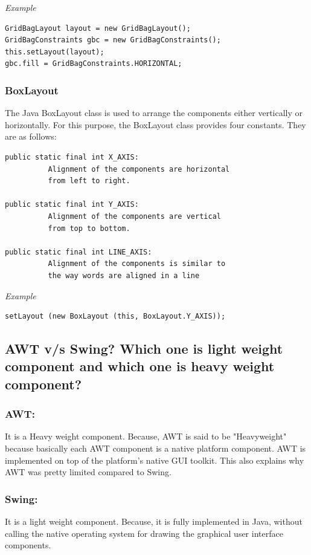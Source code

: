 \documentclass[twocolumn, a4paper]{article}
\begin{document}
\vskip10pt
\noindent\emph{Example}
\begin{lstlisting}
GridBagLayout layout = new GridBagLayout();
GridBagConstraints gbc = new GridBagConstraints();
this.setLayout(layout);
gbc.fill = GridBagConstraints.HORIZONTAL;
\end{lstlisting}

\subsubsection{BoxLayout}
The Java BoxLayout class is used to arrange the components either vertically or
horizontally. For this purpose, the BoxLayout class provides four constants.
They are as follows:
\begin{lstlisting}
public static final int X_AXIS:
          Alignment of the components are horizontal
          from left to right.

public static final int Y_AXIS:
          Alignment of the components are vertical
          from top to bottom.

public static final int LINE_AXIS:
          Alignment of the components is similar to
          the way words are aligned in a line
\end{lstlisting}

\vskip10pt
\noindent\emph{Example}
\begin{lstlisting}
setLayout (new BoxLayout (this, BoxLayout.Y_AXIS));
\end{lstlisting}

\subsection{AWT v/s Swing? Which one is light weight component and which one is heavy weight component?}
\subsubsection{AWT:}
It is a Heavy weight component. Because, AWT is said to be "Heavyweight"
because basically each AWT component is a native platform component. AWT is
implemented on top of the platform's native GUI toolkit. This also explains why
AWT was pretty limited compared to Swing.

\subsubsection{Swing:}
It is a light weight component. Because, it is fully implemented in Java,
without calling the native operating system for drawing the graphical user
interface components.
\end{document}
